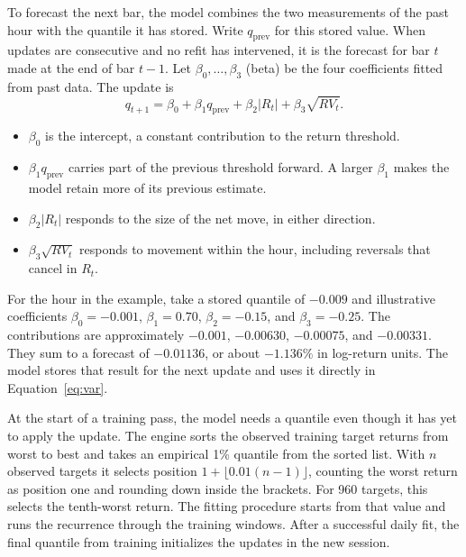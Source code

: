 \documentclass[
	12pt,				%
	openright,			%
	twoside,			%
	a4paper,
	chapter=TITLE,
	english				%
	]{abntex2}
\begin{document}
To forecast the next bar, the model combines the two measurements of the past hour with the quantile it has stored. Write $q_{\mathrm{prev}}$ for this stored value. When updates are consecutive and no refit has intervened, it is the forecast for bar $t$ made at the end of bar $t-1$. Let $\beta_0,\ldots,\beta_3$ (beta) be the four coefficients fitted from past data. The update is
\begin{equation}
  q_{t+1}=\beta_0+\beta_1 q_{\mathrm{prev}}+\beta_2 |R_t|+\beta_3\sqrt{RV_t}.
  \label{eq:caviar}
\end{equation}
\begin{samepage}
\begin{itemize}
  \item $\beta_0$ is the intercept, a constant contribution to the return threshold.
  \item $\beta_1 q_{\mathrm{prev}}$ carries part of the previous threshold forward. A larger $\beta_1$ makes the model retain more of its previous estimate.
  \item $\beta_2 |R_t|$ responds to the size of the net move, in either direction.
  \item $\beta_3\sqrt{RV_t}$ responds to movement within the hour, including reversals that cancel in $R_t$.
\end{itemize}
\par
\end{samepage}

For the hour in the example, take a stored quantile of $-0.009$ and illustrative coefficients $\beta_0=-0.001$, $\beta_1=0.70$, $\beta_2=-0.15$, and $\beta_3=-0.25$. The contributions are approximately $-0.001$, $-0.00630$, $-0.00075$, and $-0.00331$. They sum to a forecast of $-0.01136$, or about $-1.136\%$ in log-return units. The model stores that result for the next update and uses it directly in Equation~\ref{eq:var}.

At the start of a training pass, the model needs a quantile even though it has yet to apply the update. The engine sorts the observed training target returns from worst to best and takes an empirical 1\% quantile from the sorted list. With $n$ observed targets it selects position $1+\lfloor 0.01(n-1)\rfloor$, counting the worst return as position one and rounding down inside the brackets. For 960 targets, this selects the tenth-worst return. The fitting procedure starts from that value and runs the recurrence through the training windows. After a successful daily fit, the final quantile from training initializes the updates in the new session.
\end{document}
